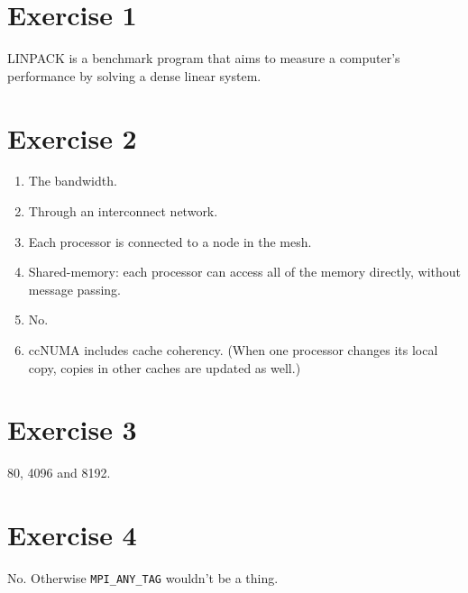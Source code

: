 \documentclass[a4paper, 12pt]{article}
\begin{document}
\section{Exercise 1} %
\label{sec:exercise_1}
LINPACK is a benchmark program that aims to measure a computer's performance by solving a dense linear system.

\section{Exercise 2} %
\label{sec:exercise_2}
\begin{enumerate}
	\item The bandwidth.
	\item Through an interconnect network.
	\item Each processor is connected to a node in the mesh.
	\item Shared-memory: each processor can access all of the memory directly, without message passing.
	\item No.
	\item ccNUMA includes cache coherency. (When one processor changes its local copy, copies in other caches are updated as well.)
\end{enumerate}

\section{Exercise 3} %
\label{sec:exercise_3}
80, 4096 and 8192.

\section{Exercise 4} %
\label{sec:exercise_4}
No. Otherwise \texttt{MPI_ANY_TAG} wouldn't be a thing.
\end{document}
